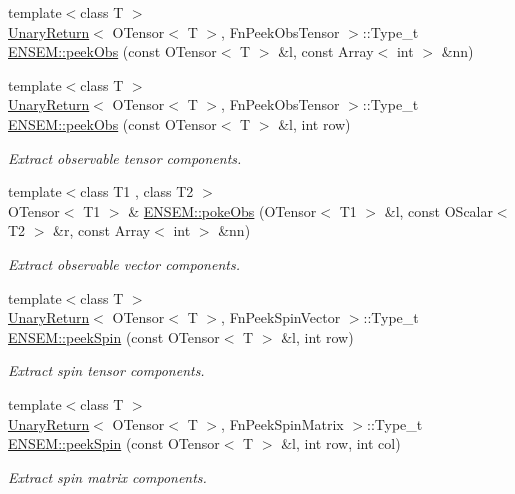 \begin{DoxyCompactItemize}
\item 
{\footnotesize template$<$class T $>$ }\\\mbox{\hyperlink{structUnaryReturn}{Unary\+Return}}$<$ O\+Tensor$<$ T $>$, Fn\+Peek\+Obs\+Tensor $>$\+::Type\+\_\+t \mbox{\hyperlink{group__obstensor_ga527c1440845b0963c06ccade99d69bf4}{E\+N\+S\+E\+M\+::peek\+Obs}} (const O\+Tensor$<$ T $>$ \&l, const Array$<$ int $>$ \&nn)
\item 
{\footnotesize template$<$class T $>$ }\\\mbox{\hyperlink{structUnaryReturn}{Unary\+Return}}$<$ O\+Tensor$<$ T $>$, Fn\+Peek\+Obs\+Tensor $>$\+::Type\+\_\+t \mbox{\hyperlink{group__obstensor_ga9fffee5b1bebf7fa7202b9b11ac11b16}{E\+N\+S\+E\+M\+::peek\+Obs}} (const O\+Tensor$<$ T $>$ \&l, int row)
\begin{DoxyCompactList}\small\item\em Extract observable tensor components. \end{DoxyCompactList}\item 
{\footnotesize template$<$class T1 , class T2 $>$ }\\O\+Tensor$<$ T1 $>$ \& \mbox{\hyperlink{group__obstensor_gaa0e4faa1f2d2fe041ebdf6ba05a05178}{E\+N\+S\+E\+M\+::poke\+Obs}} (O\+Tensor$<$ T1 $>$ \&l, const O\+Scalar$<$ T2 $>$ \&r, const Array$<$ int $>$ \&nn)
\begin{DoxyCompactList}\small\item\em Extract observable vector components. \end{DoxyCompactList}\item 
{\footnotesize template$<$class T $>$ }\\\mbox{\hyperlink{structUnaryReturn}{Unary\+Return}}$<$ O\+Tensor$<$ T $>$, Fn\+Peek\+Spin\+Vector $>$\+::Type\+\_\+t \mbox{\hyperlink{group__obstensor_gaeee51a2a721122db062ffe8a3e0192c3}{E\+N\+S\+E\+M\+::peek\+Spin}} (const O\+Tensor$<$ T $>$ \&l, int row)
\begin{DoxyCompactList}\small\item\em Extract spin tensor components. \end{DoxyCompactList}\item 
{\footnotesize template$<$class T $>$ }\\\mbox{\hyperlink{structUnaryReturn}{Unary\+Return}}$<$ O\+Tensor$<$ T $>$, Fn\+Peek\+Spin\+Matrix $>$\+::Type\+\_\+t \mbox{\hyperlink{group__obstensor_ga7cb1fd7617714b490522aee26dd999be}{E\+N\+S\+E\+M\+::peek\+Spin}} (const O\+Tensor$<$ T $>$ \&l, int row, int col)
\begin{DoxyCompactList}\small\item\em Extract spin matrix components. \end{DoxyCompactList}\item 

\end{DoxyCompactItemize}
